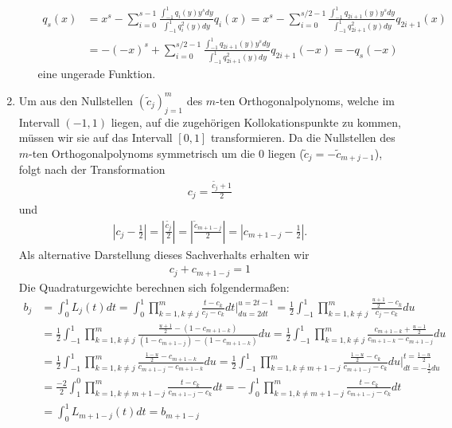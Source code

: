 \begin{solution}
\begin{enumerate}[label = \textbf{\alph*)}]
\begin{itemize}
  \begin{align*}
    q_s(x) &= x^s - \sum_{i = 0}^{s-1}\frac{\int_{-1}^1 q_i(y) y^s dy}{\int_{-1}^1 q_i^2(y) dy}q_i(x)
    = x^s - \sum_{i = 0}^{s/2-1}\frac{\int_{-1}^1q_{2i+1}(y)y^s dy}{\int_{-1}^1q_{2i+1}^2(y)dy}q_{2i+1}(x)\\
    &= -(-x)^s +
    \sum_{i = 0}^{s/2-1}\frac{\int_{-1}^1q_{2i+1}(y)y^s dy}{\int_{-1}^1q_{2i+1}^2(y)dy}q_{2i+1}(-x)
    = -q_s(-x)
  \end{align*}
  eine ungerade Funktion.
\end{itemize}
\item Um aus den Nullstellen $(\widetilde{c}_j)_{j = 1}^m$ des $m$-ten Orthogonalpolynoms,
welche im Intervall $(-1,1)$ liegen, auf die zugehörigen Kollokationspunkte zu kommen,
müssen wir sie auf das Intervall $[0,1]$ transformieren.
Da die Nullstellen des $m$-ten Orthogonalpolynoms symmetrisch um die $0$ liegen
($\widetilde{c}_j = -\widetilde{c}_{m+j-1}$), folgt nach der Transformation
\begin{align*}
  c_j = \frac{\widetilde{c_j} + 1}{2}
\end{align*}
und
\begin{align*}
  \left|c_j - \frac{1}{2}\right| = \left|\frac{\widetilde{c_j}}{2}\right| =
  \left|\frac{\widetilde{c}_{m+1-j}}{2}\right| = \left|c_{m+1-j} - \frac{1}{2}\right|.
\end{align*}
Als alternative Darstellung dieses Sachverhalts erhalten wir
\begin{align*}
  c_j + c_{m + 1 - j} = 1
\end{align*}
Die Quadraturgewichte berechnen sich folgendermaßen:
\begin{align*}
  b_j &= \int_{0}^1 L_j(t) dt
  = \int_0^1 \prod_{k = 1, k \neq j}^m\frac{t - c_k}{c_j - c_k} dt \bigg|_{du = 2dt}^{u = 2t - 1}
  = \frac{1}{2}\int_{-1}^1  \prod_{k = 1, k \neq j}^m\frac{\frac{u+1}{2} - c_k}{c_j - c_k} du \\
  &= \frac{1}{2}\int_{-1}^1  \prod_{k = 1, k \neq j}^m\frac{\frac{u+1}{2} - (1 - c_{m+1-k})}
  {(1 - c_{m+1-j}) - (1 - c_{m+1-k})} du
  = \frac{1}{2}\int_{-1}^1  \prod_{k = 1, k \neq j}^m\frac{c_{m+1-k} + \frac{u-1}{2}}
  {c_{m+1-k} - c_{m+1-j}} du \\
  &= \frac{1}{2}\int_{-1}^1  \prod_{k = 1, k \neq j}^m\frac{\frac{1-u}{2} - c_{m+1-k}}
  {c_{m+1-j} - c_{m+1-k}} du
  = \frac{1}{2}\int_{-1}^1  \prod_{k = 1, k \neq m+1-j}^m\frac{\frac{1-u}{2} - c_{k}}
  {c_{m+1-j} - c_{k}} du \bigg|_{dt = -\frac{1}{2}du}^{t = \frac{1-u}{2}} \\
  &= \frac{-2}{2}\int_{1}^0  \prod_{k = 1, k \neq m+1-j}^m\frac{t - c_{k}}
  {c_{m+1-j} - c_{k}} dt
  = -\int_{0}^1  \prod_{k = 1, k \neq m+1-j}^m\frac{t - c_{k}}
  {c_{m+1-j} - c_{k}} dt \\
  &= \int_0^1 L_{m+1-j}(t) dt = b_{m+1-j}
\end{align*}

\end{enumerate}
\end{solution}
